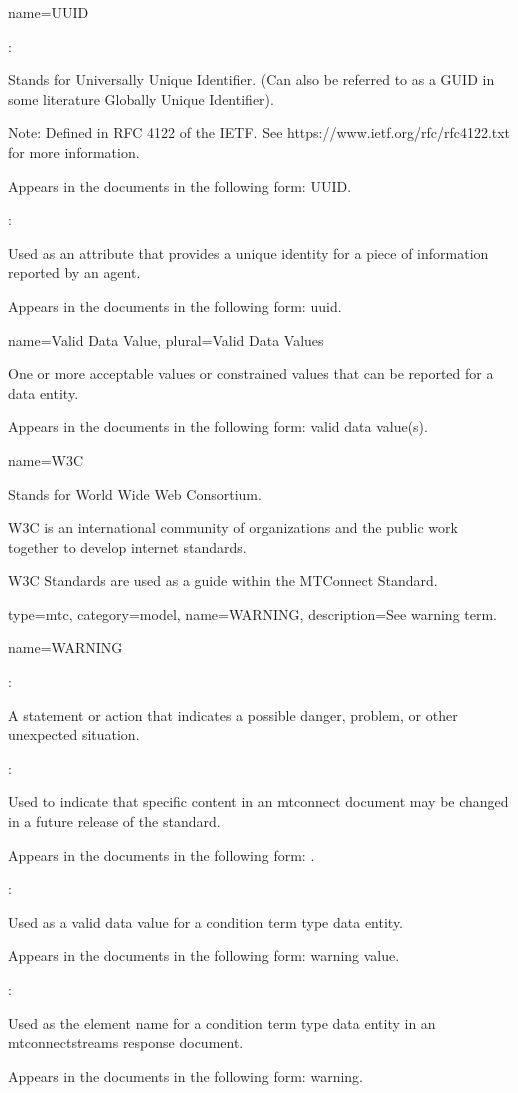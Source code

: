 {
  name={\normalfont UUID}
}
{
	:

	Stands for Universally Unique Identifier. (Can also be referred to as a GUID in some literature  Globally Unique Identifier).

	\begin{note}
	Note:  Defined in RFC 4122 of the IETF.  See https://www.ietf.org/rfc/rfc4122.txt for more information.
	\end{note}

	Appears in the documents in the following form: UUID.

	:

	Used as an attribute that provides a unique identity for a piece of information reported by an \gls{agent}.

	Appears in the documents in the following form: \gls{uuid}.
}


{
  name={Valid Data Value},
  plural={Valid Data Values}
}
{
	One or more acceptable values or constrained values that can be reported for a \gls{data entity}.

	Appears in the documents in the following form: \gls{valid data value}(s).
}


{
  name={\normalfont W3C}
}
{
	Stands for World Wide Web Consortium.

	W3C is an international community of organizations and the public work together to develop internet standards.  

	W3C Standards are used as a guide within the MTConnect Standard.
}


{
  type=mtc,
  category=model,
  name={WARNING},
  description={See \gls{warning term}.}
}


{
  name={WARNING}
}
{
	:

	A statement or action that indicates a possible danger, problem, or other unexpected situation.

	:

	Used to indicate that specific content in an \gls{mtconnect document} may be changed in a future release of the standard.

	Appears in the documents in the following form: \WARNING.

	:

	Used as a \gls{valid data value} for a \gls{condition term} type \gls{data entity}.

	Appears in the documents in the following form: \gls{warning value}.

	:

	Used as the \gls{element name} for a \gls{condition term} type \gls{data entity} in an \gls{mtconnectstreams response document}.

	Appears in the documents in the following form: \gls{warning}.
}


